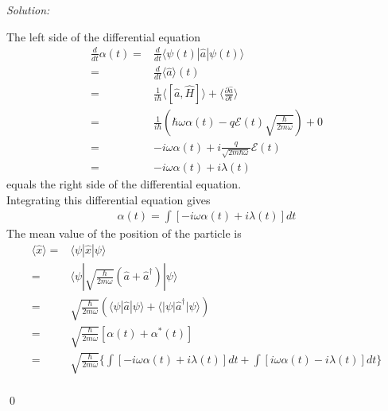 \documentclass[12pt,a4paper]{article}
\newenvironment{sol}
    {\emph{Solution:}
    }
    {
    \qed
    }
\begin{document}
\begin{sol}
\begin{itemize}
The left side of the differential equation
\begin{align}
\nonumber\frac{d}{dt}\alpha(t)=&\frac{d}{dt}\langle\psi(t)|\hat{a}|\psi(t)\rangle\\
\nonumber=&\frac{d}{dt}\langle\hat{a}\rangle(t)\\
\nonumber=&\frac{1}{i\hbar}\langle[\hat{a},\hat{H}]\rangle+\langle\frac{\partial\hat{a}}{\partial t}\rangle\\
\nonumber=&\frac{1}{i\hbar}(\hbar\omega\alpha(t)-q\mathcal{E}(t)\sqrt{\frac{\hbar}{2m\omega}})+0\\
\nonumber=&-i\omega\alpha(t)+i\frac{q}{\sqrt{2m\hbar\omega}}\mathcal{E}(t)\\
=&-i\omega\alpha(t)+i\lambda(t)
\end{align}
equals the right side of the differential equation.\\
Integrating this differential equation gives
\begin{gather}
\alpha(t)=\int[-i\omega\alpha(t)+i\lambda(t)]dt
\end{gather}
The mean value of the position of the particle is
\begin{align}
\nonumber\langle\hat{x}\rangle=&\langle\psi|\hat{x}|\psi\rangle\\
\nonumber=&\langle\psi|\sqrt{\frac{\hbar}{2m\omega}}(\hat{a}+\hat{a}^{\dagger})|\psi\rangle\\
\nonumber=&\sqrt{\frac{\hbar}{2m\omega}}(\langle\psi|\hat{a}|\psi\rangle+\langle|\psi|\hat{a}^{\dagger}|\psi\rangle)\\
\nonumber=&\sqrt{\frac{\hbar}{2m\omega}}[\alpha(t)+\alpha^*(t)]\\
\nonumber=&\sqrt{\frac{\hbar}{2m\omega}}\{\int[-i\omega\alpha(t)+i\lambda(t)]dt+\int[i\omega\alpha(t)-i\lambda(t)]dt\}\\

\end{align}
\end{itemize}
\end{sol}
\end{document}
